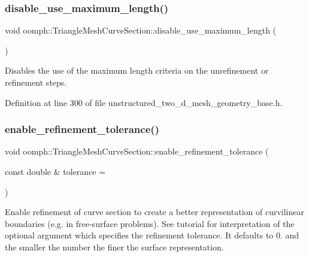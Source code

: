 \subsubsection{\texorpdfstring{disable\+\_\+use\+\_\+maximum\+\_\+length()}{disable\_use\_maximum\_length()}}
{\footnotesize\ttfamily void oomph\+::\+Triangle\+Mesh\+Curve\+Section\+::disable\+\_\+use\+\_\+maximum\+\_\+length (\begin{DoxyParamCaption}{ }\end{DoxyParamCaption})\hspace{0.3cm}{\ttfamily [inline]}}



Disables the use of the maximum length criteria on the unrefinement or refinement steps. 



Definition at line 300 of file unstructured\+\_\+two\+\_\+d\+\_\+mesh\+\_\+geometry\+\_\+base.\+h.

\mbox{\label{classoomph_1_1TriangleMeshCurveSection_ab16b55ff3346ea87b00a49ead7562cc2}} 
\subsubsection{\texorpdfstring{enable\+\_\+refinement\+\_\+tolerance()}{enable\_refinement\_tolerance()}}
{\footnotesize\ttfamily void oomph\+::\+Triangle\+Mesh\+Curve\+Section\+::enable\+\_\+refinement\+\_\+tolerance (\begin{DoxyParamCaption}\item[{const double \&}]{tolerance = {} }\end{DoxyParamCaption})\hspace{0.3cm}{\ttfamily [inline]}}



Enable refinement of curve section to create a better representation of curvilinear boundaries (e.\+g. in free-\/surface problems). See tutorial for interpretation of the optional argument which specifies the refinement tolerance. It defaults to 0. and the smaller the number the finer the surface representation. 



